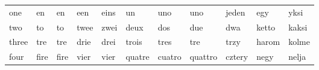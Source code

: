 \documentclass[a4paper, 20pt]{article}
\begin{document}
\begin{table}[]
\begin{tabular}{|lllllllllll|}
one                                                  & en                                                    & en                                                   & een                                                     & eins                                                 & un                                                     & uno                                                    & uno                                                    & jeden                                                & egy                                                   & yksi                                                 \\
two                                                  & to                                                    & to                                                   & twee                                                    & zwei                                                 & deux                                                   & dos                                                    & due                                                    & dwa                                                  & ketto                                                 & kaksi                                                \\
three                                                & tre                                                   & tre                                                  & drie                                                    & drei                                                 & trois                                                  & tres                                                   & tre                                                    & trzy                                                 & harom                                                 & kolme                                                \\
four                                                 & fire                                                  & fire                                                 & vier                                                    & vier                                                 & quatre                                                 & cuatro                                                 & quattro                                                & cztery                                               & negy                                                  & nelja                                                \\

\end{tabular}
\end{table}
\end{document}
